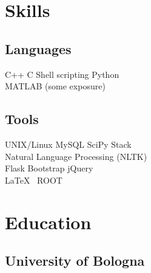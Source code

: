 \documentclass[letterpaper]{deedy-resume} %
\begin{document}
\begin{minipage}[t]{0.29\textwidth} %


\section{Skills}

\subsection{Languages}
C++ \textbullet{} C \textbullet{} Shell scripting \textbullet{} Python \\ 
 MATLAB (some exposure) \\ 

\subsection{Tools}
UNIX/Linux \textbullet{} MySQL \textbullet{} SciPy Stack \\
Natural Language Processing (NLTK) \\
Flask \textbullet{} Bootstrap \textbullet{} jQuery \\
\LaTeX\ \textbullet{} ROOT \\

\sectionspace %



\section{Education} 

\subsection{University of Bologna}


\sectionspace %


\end{minipage}
\end{document}
